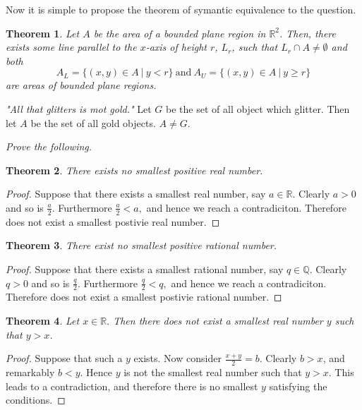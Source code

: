 \documentclass[letter]{article}
\newtheorem{theorem}{Theorem}
\newenvironment{menumerate}{%
  \edef\backupindent{\the\parindent}%
  \enumerate%
  \setlength{\parindent}{\backupindent}%
}{\endenumerate}
\begin{document}
\begin{menumerate}
\begin{menumerate}
			 Now it is simple to propose the theorem of symantic equivalence to the question.

			 \begin{theorem}
			 Let $A$ be the area of a bounded plane region in $\mathbb{R}^2$. Then, there exists some line parallel to the $x$-axis of height $r$, $L_r$, such that $L_r \cap A \neq \emptyset$ and both
			 	\begin{equation}
			 			A_L = \{ (x,y) \in A\ |\ y < r \}\ \mathrm{and}\ 
			 			A_U = \{ (x,y) \in A\ |\ y \geq r\}
	 			\end{equation}	
	 		are areas of bounded plane regions.

 			 \end{theorem}

 			 \item \textit{"All that glitters is mot gold."}  Let $G$ be the set of all object which glitter. Then let $A$ be the set of all gold objects. $A\neq G$.

		\end{menumerate} 

	\setcounter{enumi}{11}
	\item \textit{Prove the following.}
		 \begin{theorem}
			There exists no smallest positive real number.
		\end{theorem}
		\begin{proof}
		 Suppose that there exists a smallest real number, say $a \in \mathbb{R}$. Clearly $a >0$ and so is $\frac{a}{2}$. Furthermore $\frac{a}{2} < a,$  and hence we reach a contradiciton. Therefore does not exist a smallest postivie real number.
		\end{proof}
		\begin{theorem}
			There exist no smallest positive rational number. 
		\end{theorem}
		\begin{proof}
			 Suppose that there exists a smallest rational number, say $q \in \mathbb{Q}$. Clearly $q >0$ and so is $\frac{q}{2}$. Furthermore $\frac{q}{2} < q,$  and hence we reach a contradiciton. Therefore does not exist a smallest postivie rational number.
		\end{proof}

		\begin{theorem}
			Let $x \in \mathbb{R}.$ Then there does not exist a smallest real number $y$ such that $y > x$.
		\end{theorem}
		\begin{proof}
			Suppose that such a $y$ exists. Now consider $\frac{x+y}{2}= b$. Clearly $b > x$, and remarkably $b < y$. Hence $y$ is not the smallest real number such that $y > x$. This leads to a contradiction, and therefore there is no smallest $y$ satisfying the conditions.
			

\end{proof}
\end{menumerate}
\end{document}

